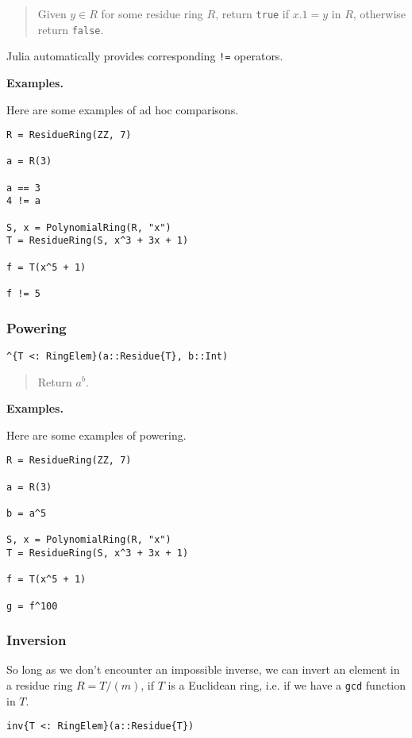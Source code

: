 \documentclass[a4paper,10pt]{article}
\newcommand{\code}{\lstinline}
\newcommand{\desc}[1]{\vspace{-3mm}\begin{quote}#1\end{quote}}
\begin{document}
\desc{Given $y \in R$ for some residue ring $R$, return \code{true} 
if $x.1 = y$ in $R$, otherwise return \code{false}.}

Julia automatically provides corresponding \code{!=} operators.

\textbf{Examples.}

Here are some examples of ad hoc comparisons.

\begin{lstlisting}
R = ResidueRing(ZZ, 7)

a = R(3)

a == 3
4 != a

S, x = PolynomialRing(R, "x")
T = ResidueRing(S, x^3 + 3x + 1)

f = T(x^5 + 1)

f != 5
\end{lstlisting}

\subsubsection{Powering}

\begin{lstlisting}
^{T <: RingElem}(a::Residue{T}, b::Int)
\end{lstlisting}

\desc{Return $a^b$.}

\textbf{Examples.}

Here are some examples of powering.

\begin{lstlisting}
R = ResidueRing(ZZ, 7)

a = R(3)

b = a^5

S, x = PolynomialRing(R, "x")
T = ResidueRing(S, x^3 + 3x + 1)

f = T(x^5 + 1)

g = f^100
\end{lstlisting}

\subsubsection{Inversion}

So long as we don't encounter an impossible inverse, we can
invert an element in a residue ring $R = T/(m)$, if $T$ is a
Euclidean ring, i.e. if we have a \code{gcd} function in $T$.

\begin{lstlisting}
inv{T <: RingElem}(a::Residue{T})
\end{lstlisting}
\end{document}
